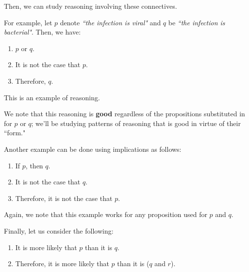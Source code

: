 \documentclass[openany]{book}
\begin{document}
Then, we can study reasoning involving these connectives.
\begin{example}
	For example, let $p$ denote \textit{``the infection is viral"} and $q$ be \textit{``the infection is bacterial"}. Then, we have:
	\begin{enumerate}
		\item $p$ or $q$.
		\item It is not the case that $p$.
		\item Therefore, $q$.
	\end{enumerate}

	This is an example of reasoning.
\end{example}
\begin{warn}
	We note that this reasoning is \textbf{good} regardless of the propositions substituted in for $p$ or $q$; we'll be studying patterns of reasoning that is good in virtue of their ``form."
\end{warn}

\begin{example}
	Another example can be done using implications as follows:
	\begin{enumerate}
		\item If $p$, then $q$.
		\item It is not the case that $q$.
		\item Therefore, it is not the case that $p$.
	\end{enumerate}

	Again, we note that this example works for any proposition used for $p$ and $q$.
\end{example}

\begin{example}
	Finally, let us consider the following:
	\begin{enumerate}
		\item It is more likely that $p$ than it is $q$.
		\item Therefore, it is more likely that $p$ than it is ($q$ and $r$).
	\end{enumerate}
\end{example}
\end{document}
